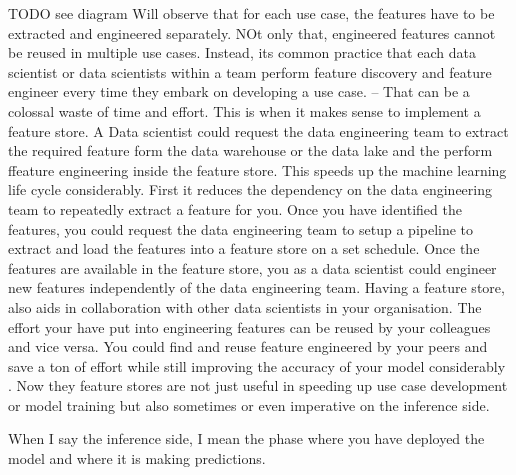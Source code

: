 \documentclass[a4paper, 11pt]{article}
\begin{document}
    TODO see diagram
    Will observe that for each use case, the features have to be extracted and engineered separately.
    NOt only that, engineered features cannot be reused in multiple use cases.
    Instead, its common practice that each data scientist or data scientists within a team perform feature discovery and feature engineer every time they embark on developing a use case.
    -- That can be a colossal waste of time and effort.
    This is when it makes sense to implement a feature store.
    A Data scientist could request the data engineering team to extract the required feature form the data warehouse or the data lake and the perform ffeature engineering inside the feature store.
    This speeds up the machine learning life cycle considerably.
    First it reduces the dependency on the data engineering team to repeatedly extract a feature for you.
    Once you have identified the features, you could request the data engineering team to setup a pipeline to extract and load the features into a feature store on a set schedule.
    Once the features are available in the feature store, you as a data scientist could engineer new features independently of the data engineering team.
    Having a feature store, also aids in collaboration with other data scientists in your organisation.
    The effort your have put into engineering features can be reused by your colleagues and vice versa.
    You could find and reuse feature engineered by your peers and save a ton of effort while still improving the accuracy of your model considerably .
    Now they feature stores are not just useful in speeding up use case development or model training but also sometimes or even imperative on the inference side.

    When I say the inference side, I mean the phase where you have deployed the model and where it is making predictions.
\end{document}
